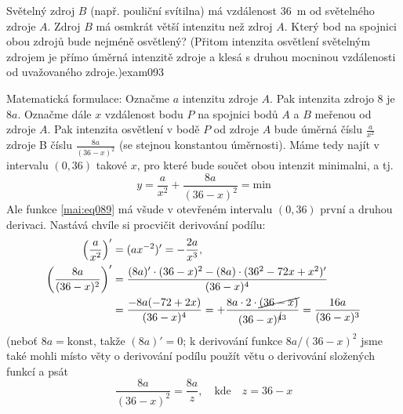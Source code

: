 \begin{mathexam}{Světelný zdroj \(B\) (např. pouliční svítilna) má vzdálenost \qty{36}{\m} od
  světelného zdroje \(A\). Zdroj \(B\) má osmkrát větší intenzitu než zdroj \(A\). Který bod na
  spojnici obou zdrojů bude nejméně osvětlený? (Přitom intenzita osvětlení světelným zdrojem je
  přímo úměrná intenzitě zdroje a klesá s druhou mocninou vzdálenosti od uvažovaného
  zdroje.)}{exam093} 
  
  {\centering
    \captionsetup{type=figure}
    \label{mai:fig063}
  \par}      

  Matematická formulace: Označme \(a\) intenzitu zdroje \(A\). Pak intenzita zdrojo \(8\) je \(8a\).
  Označme dále \(x\) vzdálenost bodu \(P\) na spojnici bodů \(A\) a \(B\) meřenou od zdroje \(A\).
  Pak intenzita osvětlení v bodě \(P\) od zdroje \(A\) bude úměrná číslu \(\frac{a}{x^2}\) zdroje B
  číslu \(\frac{8a}{(36 - x)^2}\) (se stejnou konstantou úměrnosti). Máme tedy najít v intervalu
  \((0,36)\) takové \(x\), pro které bude součet obou intenzit minimalni, a tj.
  \begin{equation}\label{mai:eq089}
    y = \dfrac{a}{x^2} + \dfrac{8a}{(36 - x)^2} = \text{min}
  \end{equation}
  Ale funkce \ref{mai:eq089} má všude v otevřeném intervalu  \((0,36)\) první a druhou derivaci.
  Nastává chvíle si procvičit derivování podílu:
  \begin{gather*}
    \begin{align*} 
      \left(\dfrac{a}{x^2}\right)'          
        &= (ax^{-2})' = -\dfrac{2a}{x^3},   \\ 
      \left( \dfrac{8a}{(36 - x)^2}\right)' 
        &= \dfrac{(8a)'\cdot(36 - x)^2 - (8a)\cdot(36^2 - 72x + x^2)'}{(36 - x)^4} \\
        &= \dfrac{-8a(-72 + 2x)}{(36 - x)^4} 
         = +\dfrac{8a\cdot2\cdot\cancel{(36 - x)}}{(36 - x)^{\cancel{4}3}}
         =  \dfrac{16a}{(36 - x)^3}
    \end{align*}
  \end{gather*}
  (neboť \(8a = \text{konst}\), takže \((8a)' = 0\); k derivování funkce \(8a/(36 - x)^2\) jsme také
  mohli místo věty o derivování podílu použít větu o derivování složených funkcí a psát
  \begin{equation*}
    \dfrac{8a}{(36 - x)^2} = \dfrac{8a}{z}, \quad\text{kde}\quad z = 36 - x

\end{equation*}
\end{mathexam}
